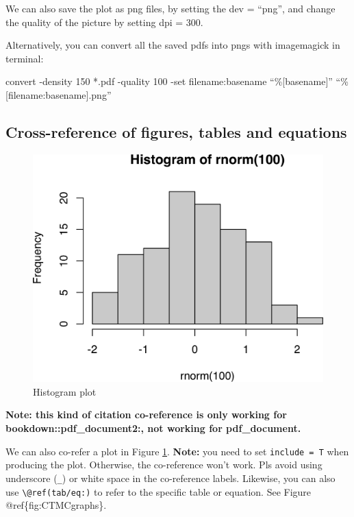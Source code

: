 \documentclass[
]{article}
\begin{document}
We can also save the plot as png files, by setting the dev = ``png'', and change the quality of the picture by setting dpi = 300.

Alternatively, you can convert all the saved pdfs into pngs with imagemagick in terminal:

convert -density 150 *.pdf -quality 100 -set filename:basename ``\%{[}basename{]}'' ``\%{[}filename:basename{]}.png''

\subsection{Cross-reference of figures, tables and equations}\label{cross-reference-of-figures-tables-and-equations}

\begin{figure}
\centering
\includegraphics{figures/histogram-rng-1.png}
\caption{\label{fig:histogram-rng}Histogram plot}
\end{figure}

\textbf{Note: this kind of citation co-reference is only working for bookdown::pdf\_document2:, not working for pdf\_document.}

We can also co-refer a plot in Figure \ref{fig:histogram-rng}. \textbf{Note:} you need to set \texttt{include\ =\ T} when producing the plot. Otherwise, the co-reference won't work. Pls avoid using underscore (\texttt{\_}) or white space in the co-reference labels. Likewise, you can also use \texttt{\textbackslash{}@ref(tab/eq:)} to refer to the specific table or equation. See Figure @ref\{fig:CTMCgraphs\}.
\end{document}

